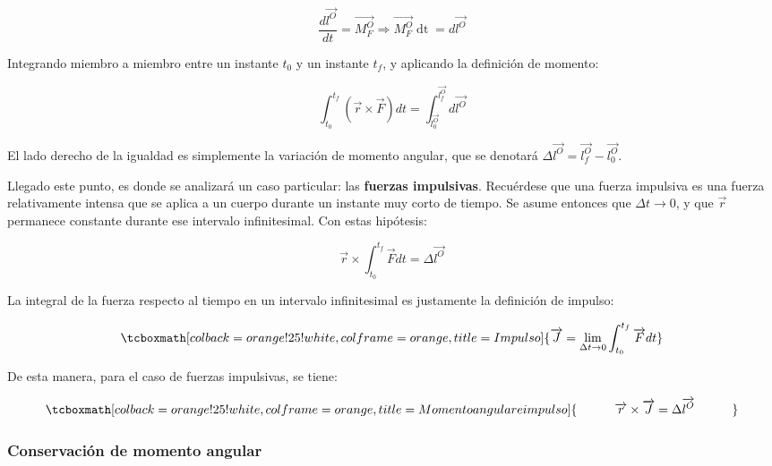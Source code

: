 \documentclass{article}
\begin{document}
\begin{equation}
\frac{d\overrightarrow{l^O}}{dt} = \overrightarrow{M^O_F} \Rightarrow \overrightarrow{M^O_F} \mathop{dt} = d\overrightarrow{l^O}
\end{equation}

Integrando miembro a miembro entre un instante $t_0$ y un instante $t_f$, y aplicando la definición de momento:

\begin{equation}
\int_{t_0}^{t_f} (\overrightarrow{r} \times \overrightarrow{F}) dt = \int_{\overrightarrow{l^O_0}}^{\overrightarrow{l^O_f}} d\overrightarrow{l^O}
\end{equation}

El lado derecho de la igualdad es simplemente la variación de momento angular, que se denotará $\Delta\overrightarrow{l^O} = \overrightarrow{l^O_f} - \overrightarrow{l^O_0}$.

Llegado este punto, es donde se analizará un caso particular: las \textbf{fuerzas impulsivas}. Recuérdese que una fuerza impulsiva es una fuerza relativamente intensa que se aplica a un cuerpo durante un instante muy corto de tiempo. Se asume entonces que $\Delta t \rightarrow 0$, y que $\overrightarrow{r}$ permanece constante durante ese intervalo infinitesimal. Con estas hipótesis:

\begin{equation}
\overrightarrow{r} \times \int_{t_0}^{t_f} \overrightarrow{F} dt = \Delta \overrightarrow{l^O}
\end{equation}

La integral de la fuerza respecto al tiempo en un intervalo infinitesimal es justamente la definición de impulso:

\begin{equation}
\tcboxmath[colback=orange!25!white,colframe=orange,title=Impulso]{
\overrightarrow{J} = \lim_{\Delta t \rightarrow 0} \int_{t_0}^{t_f} \overrightarrow{F} dt
}
\end{equation}

De esta manera, para el caso de fuerzas impulsivas, se tiene:

\begin{equation}
\tcboxmath[colback=orange!25!white,colframe=orange,title=Momento angular e impulso]{
\quad \quad \quad \overrightarrow{r} \times \overrightarrow{J} = \Delta \overrightarrow{l^O} \quad \quad \quad
}
\end{equation}

\subsubsection{Conservación de momento angular}
\end{document}

